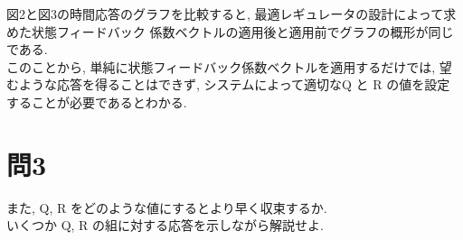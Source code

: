\documentclass{jsarticle}
\begin{document}
図2と図3の時間応答のグラフを比較すると, 最適レギュレータの設計によって求めた状態フィードバック
\hspace*{1zw}係数ベクトルの適用後と適用前でグラフの概形が同じである.\\

このことから, 単純に状態フィードバック係数ベクトルを適用するだけでは, 望むような応答を得ることは\hspace*{1zw}できず, 
システムによって適切なQ と R の値を設定することが必要であるとわかる.

\section*{問3}
また, Q, R をどのような値にするとより早く収束するか.\\
\hspace*{1zw}いくつか Q, R の組に対する応答を示しながら解説せよ.\\







\end{document}

